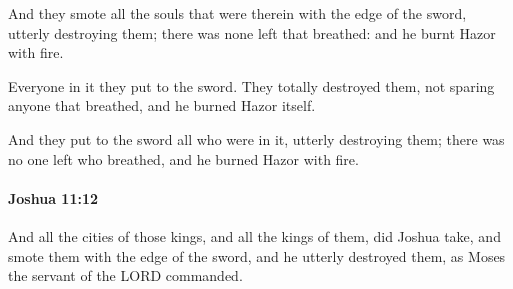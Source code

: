 			\begin{versebox}
					\item[BHS] 
					\item[ASV] And they smote all the souls that were therein with the edge of the sword, utterly destroying them; there was none left that breathed: and he burnt Hazor with fire.
					\item[NIV] Everyone in it they put to the sword. They totally destroyed them, not sparing anyone that breathed, and he burned Hazor itself.
					\item[NRSV] And they put to the sword all who were in it, utterly destroying them; there was no one left who breathed, and he burned Hazor with fire.
			\end{versebox}

		\paragraph{Joshua 11:12} %
			\label{JOSHUA-11-12}

			And all the cities of those kings, and all the kings of them, did Joshua take, and smote them with the edge of the sword, and he utterly destroyed them, as Moses the servant of the LORD commanded.

